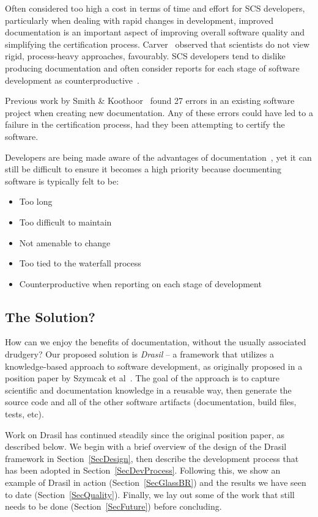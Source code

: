 \documentclass[sigconf]{acmart}
\begin{document}
Often considered too high a cost in terms of time and effort for SCS developers, 
particularly when dealing with rapid changes in development, improved 
documentation is an important aspect of improving overall software quality and 
simplifying the certification process. Carver~\cite{CarverEtAl2007} observed 
that scientists do not view rigid, process-heavy approaches, favourably. SCS 
developers tend to dislike producing documentation and often consider reports 
for each stage of software development as 
counterproductive~\cite[p.~373]{Roache1998}.

Previous work by Smith \& Koothoor~\citep{SmithAndKoothoor2016} found 27 errors 
in an existing software project when creating new documentation. Any of these errors could have led to a failure in the certification process, had they been attempting to certify the software.

Developers are being made aware of the advantages of documentation~\cite{SmithJegatheesanAndKelly2016}, yet it can still be difficult to ensure it becomes a high priority because documenting software is typically felt to be:

\begin{itemize}
\item Too long
\item Too difficult to maintain
\item Not amenable to change
\item Too tied to the waterfall process
\item Counterproductive when reporting on each stage of 
		development~\citep{Roache1998}
\end{itemize}



\subsection*{The Solution?}

How can we enjoy the benefits of documentation, without the usually associated
drudgery?  Our proposed solution is \textit{Drasil} -- a framework that utilizes
a knowledge-based approach to software development, as originally proposed in a
position paper by Szymcak et al~\cite{SzymczakEtAl2016}. The goal of the
approach is to capture scientific and documentation knowledge in a reusable way,
then generate the source code and all of the other software artifacts
(documentation, build files, tests, etc).

Work on Drasil has continued steadily since the original position paper, as
described below. We begin with a brief overview of the design of the Drasil
framework in Section~\ref{SecDesign}, then describe the development process that
has been adopted in Section~\ref{SecDevProcess}. Following this, we show an example of
Drasil in action (Section~\ref{SecGlassBR}) and the results we have seen to date
(Section~\ref{SecQuality}). Finally, we lay out some of the work that still
needs to be done (Section~\ref{SecFuture}) before concluding.
\end{document}
